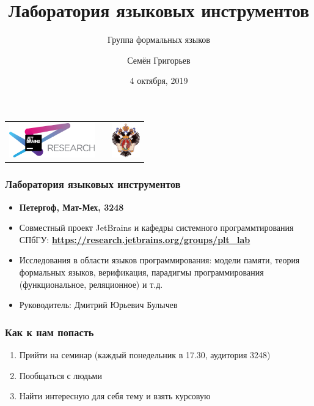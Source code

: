 \documentclass[xcolor=table]{beamer}
\title[JBR PLT lab]{Лаборатория языковых инструментов}
\subtitle[]{Группа формальных языков}
\institute[JetBrains Research]{
JetBrains Research, Лаборатория языковых инстументов \\
Санкт-Петербургский Государственный Университет
}
\author[Семён Григорьев]{Семён Григорьев}
\date{4 октября, 2019}
\begin{document}
{
\begin{frame}[fragile]
  \begin{table}
  \centering
  \begin{tabularx}{\linewidth}{YcX}
    \includegraphics[height=1.5cm]{pictures/jetbrainsResearch.pdf} \hfill
    & \begin{minipage}[t]{0.3\textwidth}
      \end{minipage}
    & \hfill \includegraphics[height=1.5cm]{pictures/SPbGU_Logo.png}
  \end{tabularx}
  \end{table}
  \titlepage
\end{frame}
}

\begin{frame} \frametitle{Лаборатория языковых инструментов}
  \begin{itemize}
        \item \textbf{Петергоф, Мат-Мех, 3248}
        \item Совместный проект JetBrains и кафедры системного программтирования СПбГУ: \textbf{\url{https://research.jetbrains.org/groups/plt_lab}}
        \item Исследования в области языков программирования: модели памяти, теория формальных языков, верификация, парадигмы программирования (функциональное, реляционное) и т.д.
        \item Руководитель: Дмитрий Юрьевич Булычев
  \end{itemize}

\end{frame}

\begin{frame}[fragile] \frametitle{Как к нам попасть}
    \begin{enumerate}
      \item Прийти на семинар (каждый понедельник в 17.30, аудитория 3248)
      \item Пообщаться с людьми
      \item Найти интересную для себя тему и взять курсовую
    \end{enumerate}
\end{frame}
\end{document}
